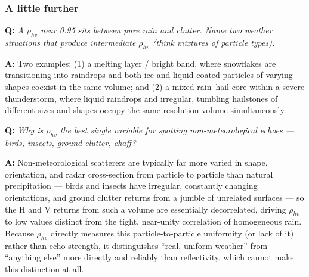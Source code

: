 \documentclass[11pt]{article}
\newenvironment{qa}[1]{\par\noindent\textbf{\color{qgray}Q: }\emph{#1}\par\noindent\textbf{A: }}{\par\vspace{6pt}}
\newcommand{\tier}[1]{\subsubsection*{#1}}
\begin{document}
\tier{A little further}
\begin{qa}{A $\rho_{hv}$ near 0.95 sits between pure rain and clutter. Name two \emph{weather} situations that produce intermediate $\rho_{hv}$ (think mixtures of particle types).}
Two examples: (1) a melting layer / bright band, where snowflakes are transitioning into raindrops and both ice and liquid-coated particles of varying shapes coexist in the same volume; and (2) a mixed rain--hail core within a severe thunderstorm, where liquid raindrops and irregular, tumbling hailstones of different sizes and shapes occupy the same resolution volume simultaneously.
\end{qa}
\begin{qa}{Why is $\rho_{hv}$ the best single variable for spotting non-meteorological echoes --- birds, insects, ground clutter, chaff?}
Non-meteorological scatterers are typically far more varied in shape, orientation, and radar cross-section from particle to particle than natural precipitation --- birds and insects have irregular, constantly changing orientations, and ground clutter returns from a jumble of unrelated surfaces --- so the H and V returns from such a volume are essentially decorrelated, driving $\rho_{hv}$ to low values distinct from the tight, near-unity correlation of homogeneous rain. Because $\rho_{hv}$ directly measures this particle-to-particle uniformity (or lack of it) rather than echo strength, it distinguishes ``real, uniform weather'' from ``anything else'' more directly and reliably than reflectivity, which cannot make this distinction at all.
\end{qa}
\end{document}
